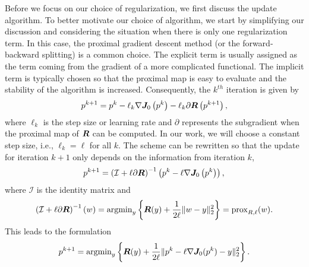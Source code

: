 Before we focus on our choice of regularization, we first discuss the update algorithm.
To better motivate our choice of algorithm, we start by simplifying our discussion and considering the situation when there is only one regularization term.  In this case, the proximal gradient descent method (or the forward-backward splitting) \cite{Beck2017First-OrderOptimization,Parikh2014ProximalAlgorithms} is a common choice. The explicit term is usually assigned as the term coming from the gradient of a more complicated functional. The implicit term is typically chosen so that the proximal map is easy to evaluate and the stability of the algorithm is increased. Consequently, the $k^{th}$ iteration is given by
\begin{equation} \label{time_update}
    \begin{split}
        & p^{k+1} 
        = p^k - \ell_k \nabla \bm{J}_0\left(p^k\right) - \ell_k \partial \bm{R}\left(p^{k+1}\right), \\
    \end{split}
\end{equation}
where $\ell_k$ is the step size or learning rate and $\partial$ represents the subgradient when the proximal map of $\bm{R}$ can be computed. In our work, we will choose a constant step size, i.e., $\ell_k = \ell$ for all $k$.  The scheme can be rewritten so that the update for iteration $k+1$ only depends on the information from iteration $k$,
\begin{equation} \label{time_update1}
        p^{k+1} = \left(\mathcal{I} + \ell \partial \bm{R}\right)^{-1}\left(p^{k} - \ell \nabla \bm{J}_0\left(p^{k}\right)\right), \\
\end{equation}
where $\mathcal{I}$ is the identity matrix and
\begin{equation} \label{time_update_2}
    \left(\mathcal{I} + \ell \partial \bm{R}\right)^{-1}(w) 
    = \text{argmin}_y \left\{\bm{R}(y) + \frac{1}{2\ell} \|w-y\|_2^2\right\} 
    = \text{prox}_{R,\ell}(w).
\end{equation}
This leads to the formulation
\begin{equation}
     p^{k+1} 
     = \text{argmin}_y \left\{\bm{R}(y) + \frac{1}{2\ell} \|p^{k}-\ell \nabla \bm{J}_0(p^{k}) - y\|_2^2\right\}. 
\end{equation}
